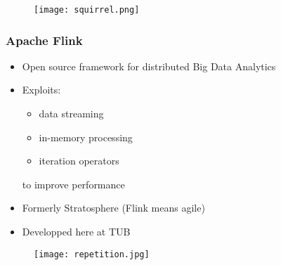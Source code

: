 \begin{frame}
\begin{figure}
	\centering
	\texttt{[image: squirrel.png]}
	\caption*{\cite{squirrel}}
\end{figure}
\end{frame}

\begin{frame}
\frametitle{Apache Flink}
\begin{itemize}
\item Open source framework for distributed Big Data Analytics
\item Exploits:
	\begin{itemize}
	\item data streaming
	\item in-memory processing
	\item iteration operators
	\end{itemize}
to improve performance
\item Formerly Stratosphere (Flink means agile)
\item Developped here at TUB
\end{itemize}
\end{frame}

\begin{frame}
\begin{figure}
	\centering
	\texttt{[image: repetition.jpg]}
	\caption*{\cite{repetition}}
\end{figure}
\end{frame}

